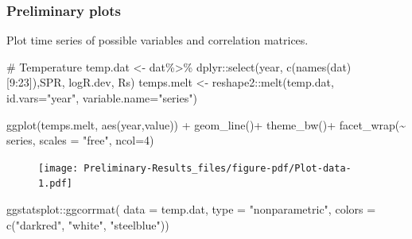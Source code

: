 \documentclass[
  letterpaper,
  DIV=11,
  numbers=noendperiod]{scrartcl}
\newenvironment{Shaded}{\begin{snugshade}}{\end{snugshade}}
\newcommand{\AttributeTok}[1]{\textcolor[rgb]{0.40,0.45,0.13}{#1}}
\newcommand{\CommentTok}[1]{\textcolor[rgb]{0.37,0.37,0.37}{#1}}
\newcommand{\DecValTok}[1]{\textcolor[rgb]{0.68,0.00,0.00}{#1}}
\newcommand{\FunctionTok}[1]{\textcolor[rgb]{0.28,0.35,0.67}{#1}}
\newcommand{\NormalTok}[1]{\textcolor[rgb]{0.00,0.23,0.31}{#1}}
\newcommand{\OtherTok}[1]{\textcolor[rgb]{0.00,0.23,0.31}{#1}}
\newcommand{\SpecialCharTok}[1]{\textcolor[rgb]{0.37,0.37,0.37}{#1}}
\newcommand{\StringTok}[1]{\textcolor[rgb]{0.13,0.47,0.30}{#1}}
\begin{document}
\hypertarget{preliminary-plots}{%
\subsubsection{Preliminary plots}\label{preliminary-plots}}

Plot time series of possible variables and correlation matrices.

\begin{Shaded}
\begin{Highlighting}[]
\CommentTok{\# Temperature}
\NormalTok{temp.dat }\OtherTok{\textless{}{-}}\NormalTok{ dat}\SpecialCharTok{\%\textgreater{}\%} 
\NormalTok{  dplyr}\SpecialCharTok{::}\FunctionTok{select}\NormalTok{(year, }\FunctionTok{c}\NormalTok{(}\FunctionTok{names}\NormalTok{(dat)[}\DecValTok{9}\SpecialCharTok{:}\DecValTok{23}\NormalTok{]),SPR, logR.dev, Rs)}
\NormalTok{temps.melt }\OtherTok{\textless{}{-}}\NormalTok{ reshape2}\SpecialCharTok{::}\FunctionTok{melt}\NormalTok{(temp.dat, }\AttributeTok{id.vars=}\StringTok{"year"}\NormalTok{, }\AttributeTok{variable.name=}\StringTok{"series"}\NormalTok{)}

\FunctionTok{ggplot}\NormalTok{(temps.melt, }\FunctionTok{aes}\NormalTok{(year,value)) }\SpecialCharTok{+}
  \FunctionTok{geom\_line}\NormalTok{()}\SpecialCharTok{+} 
  \FunctionTok{theme\_bw}\NormalTok{()}\SpecialCharTok{+}
  \FunctionTok{facet\_wrap}\NormalTok{(}\SpecialCharTok{\textasciitilde{}}\NormalTok{ series, }\AttributeTok{scales =} \StringTok{"free"}\NormalTok{, }\AttributeTok{ncol=}\DecValTok{4}\NormalTok{)}
\end{Highlighting}
\end{Shaded}

\begin{figure}[H]

{\centering \texttt{[image: Preliminary-Results\_files/figure-pdf/Plot-data-1.pdf]}

}

\end{figure}

\begin{Shaded}
\begin{Highlighting}[]
\NormalTok{ggstatsplot}\SpecialCharTok{::}\FunctionTok{ggcorrmat}\NormalTok{(}
  \AttributeTok{data =}\NormalTok{ temp.dat,}
  \AttributeTok{type =} \StringTok{"nonparametric"}\NormalTok{, }
  \AttributeTok{colors =} \FunctionTok{c}\NormalTok{(}\StringTok{"darkred"}\NormalTok{, }\StringTok{"white"}\NormalTok{, }\StringTok{"steelblue"}\NormalTok{))}
\end{Highlighting}
\end{Shaded}
\end{document}
